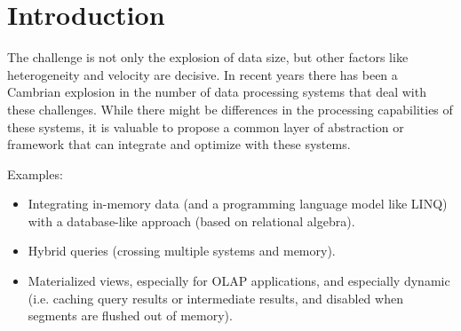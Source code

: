 \section{Introduction}
\label{sec:intro}

The challenge is not only the explosion of data size, but other factors like heterogeneity and velocity are decisive.
In recent years there has been a Cambrian explosion in the number of data processing systems that deal with these challenges.
While there might be differences in the processing capabilities of these systems, it is valuable to propose a common layer of abstraction or framework that can integrate and optimize with these systems.

Examples:
\begin{itemize}
	\item Integrating in-memory data (and a programming language model like LINQ) with a database-like approach (based on relational algebra).
	\item Hybrid queries (crossing multiple systems and memory).
	\item Materialized views, especially for OLAP applications, and especially dynamic (i.e. caching query results or intermediate results, and disabled when segments are flushed out of memory).
\end{itemize}




